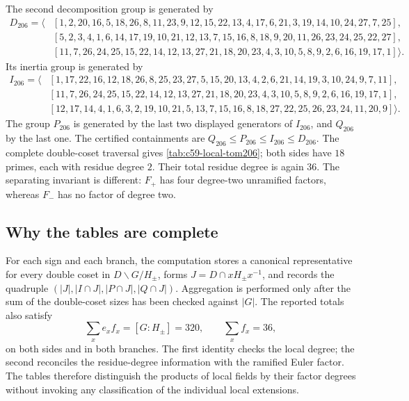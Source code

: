 The second decomposition group is generated by
\begin{align*}
D_{206}=\langle
&[1,2,20,16,5,18,26,8,11,23,9,12,15,22,13,4,17,6,21,3,19,14,10,24,27,7,25],\\
&[5,2,3,4,1,6,14,17,19,10,21,12,13,7,15,16,8,18,9,20,11,26,23,24,25,22,27],\\
&[11,7,26,24,25,15,22,14,12,13,27,21,18,20,23,4,3,10,5,8,9,2,6,16,19,17,1]
\rangle .
\end{align*}
Its inertia group is generated by
\begin{align*}
I_{206}=\langle
&[1,17,22,16,12,18,26,8,25,23,27,5,15,20,13,4,2,6,21,14,19,3,10,24,9,7,11],\\
&[11,7,26,24,25,15,22,14,12,13,27,21,18,20,23,4,3,10,5,8,9,2,6,16,19,17,1],\\
&[12,17,14,4,1,6,3,2,19,10,21,5,13,7,15,16,8,18,27,22,25,26,23,24,11,20,9]
\rangle .
\end{align*}
The group $P_{206}$ is generated by the last two displayed generators of
$I_{206}$, and $Q_{206}$ by the last one.  The certified containments are
$Q_{206}\le P_{206}\le I_{206}\le D_{206}$.  The complete double-coset
traversal gives \cref{tab:c59-local-tom206}; both sides have $18$ primes,
each with residue degree $2$.  Their total residue degree is again $36$.
The separating invariant is different: $F_+$ has four degree-two
unramified factors, whereas $F_-$ has no factor of degree two.

\subsection{Why the tables are complete}

For each sign and each branch, the computation stores a canonical
representative for every double coset in $D\backslash G/H_\pm$, forms
$J=D\cap xH_\pm x^{-1}$, and records the quadruple
$(|J|,|I\cap J|,|P\cap J|,|Q\cap J|)$.  Aggregation is performed only after
the sum of the double-coset sizes has been checked against $|G|$.  The
reported totals also satisfy
\[
 \sum_x e_xf_x=[G:H_\pm]=320,
 \qquad \sum_x f_x=36,
\]
on both sides and in both branches.  The first identity checks the local
degree; the second reconciles the residue-degree information with the
ramified Euler factor.  The tables therefore distinguish the products of
local fields by their factor degrees without invoking any classification
of the individual local extensions.
